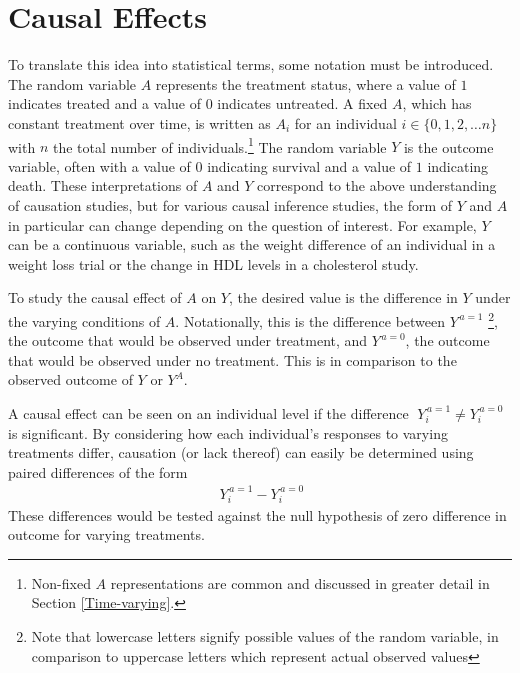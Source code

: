 \section{Causal Effects} 
To translate this idea into statistical terms, some notation must be introduced.  The random variable $A$ represents the treatment status, where a value of $1$ indicates treated and a value of $0$ indicates untreated.  A fixed $A$, which has constant treatment over time, is written as $A_i$ for an individual $i \in \{0,1,2,\dots n\}$ with $n$ the total number of individuals.\footnote{Non-fixed $A$ representations are common and discussed in greater detail in Section \ref{Time-varying}.} The random variable $Y$ is the outcome variable, often with a value of $0$ indicating survival and a value of $1$ indicating death.  These interpretations of $A$ and $Y$ correspond to the above understanding of causation studies, but for various causal inference studies, the form of $Y$ and $A$ in particular can change depending on the question of interest.  For example, $Y$ can be a continuous variable, such as the weight difference of an individual in a weight loss trial or the change in HDL levels in a cholesterol study. 

To study the causal effect of $A$ on $Y$, the desired value is the difference in $Y$ under the varying conditions of $A$.  Notationally, this is the difference between $Y^{\, a=1}$ \footnote{Note that lowercase letters signify possible values of the random variable, in comparison to uppercase letters which represent actual observed values}, the outcome that would be observed under treatment, and $Y^{\, a=0}$, the outcome that would be observed under no treatment.  This is in comparison to the observed outcome of $Y$ or $Y^A$.  

A causal effect can be seen on an individual level if the difference $\; Y_i^{\, a=1} \neq Y_i^{\, a=0}$ is significant.  By considering how each individual's responses to varying treatments differ, causation (or lack thereof) can easily be determined using paired differences of the form 
\begin{align} \; Y_i^{\, a=1} - Y_i^{\, a=0}\end{align} 
These differences would be tested against the null hypothesis of zero difference in outcome for varying treatments.  

